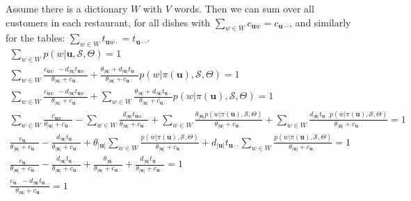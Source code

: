 Assume there is a dictionary $W$ with $V$ words. Then we can sum over all customers in each restaurant, for all dishes with $\sum_{w\in W} c_{\mathbf{u}w} = c_{\mathbf{u}\cdot\cdot}$, and similarly for the tables: $\sum_{w\in W} t_{\mathbf{u}w\cdot} = t_{\mathbf{u}\cdot\cdot}$. 
\begin{equation}
\begin{split}
	\sum_{w\in W} p(w | \mathbf{u}, \mathcal{S}, \Theta) = 1 \\
    \sum_{w\in W}\frac{c_{\mathbf{u}w\cdot} - d_{|\mathbf{u}|}t_{\mathbf{u}w\cdot}}{\theta_{|\mathbf{u}|}+c_{\mathbf{u}\cdot\cdot}} + \frac{\theta_{|\mathbf{u}|} + d_{|\mathbf{u}|}t_{\mathbf{u}\cdot\cdot}}{\theta_{|\mathbf{u}|}+c_{\mathbf{u}\cdot\cdot}} p(w | \pi(\mathbf{u}), \mathcal{S}, \Theta) = 1 \\
    \sum_{w\in W}\frac{c_{\mathbf{u}w\cdot} - d_{|\mathbf{u}|}t_{\mathbf{u}w\cdot}}{\theta_{|\mathbf{u}|}+c_{\mathbf{u}\cdot\cdot}} + \sum_{w\in W} \frac{\theta_{|\mathbf{u}|} + d_{|\mathbf{u}|}t_{\mathbf{u}\cdot\cdot}}{\theta_{|\mathbf{u}|}+c_{\mathbf{u}\cdot\cdot}} p(w | \pi(\mathbf{u}), \mathcal{S}, \Theta) =1 \\
    \sum_{w\in W} \frac{c_{\mathbf{u}w\cdot}}{\theta_{|\mathbf{u}|}+c_{\mathbf{u}\cdot\cdot}} - \sum_{w\in W} \frac{d_{|\mathbf{u}|}t_{\mathbf{u}w\cdot}}{\theta_{|\mathbf{u}|}+c_{\mathbf{u}\cdot\cdot}} + \sum_{w\in W} \frac{\theta_{|\mathbf{u}|}p(w | \pi(\mathbf{u}), \mathcal{S}, \Theta)}{\theta_{|\mathbf{u}|}+c_{\mathbf{u}\cdot\cdot}} + \sum_{w\in W} \frac{d_{|\mathbf{u}|}t_{\mathbf{u}\cdot\cdot} p(w | \pi(\mathbf{u}), \mathcal{S}, \Theta)}{\theta_{|\mathbf{u}|}+c_{\mathbf{u}\cdot\cdot}} = 1 \\
    \frac{c_{\mathbf{u}\cdot\cdot}}{\theta_{|\mathbf{u}|}+c_{\mathbf{u}\cdot\cdot}} - \frac{d_{|\mathbf{u}|}t_{\mathbf{u}\cdot\cdot}}{\theta_{|\mathbf{u}|}+c_{\mathbf{u}\cdot\cdot}} + \theta_{|\mathbf{u}|}\sum_{w\in W} \frac{p(w | \pi(\mathbf{u}), \mathcal{S}, \Theta)}{\theta_{|\mathbf{u}|}+c_{\mathbf{u}\cdot\cdot}} + d_{|\mathbf{u}|}t_{\mathbf{u}\cdot\cdot}\sum_{w\in W} \frac{ p(w | \pi(\mathbf{u}), \mathcal{S}, \Theta)}{\theta_{|\mathbf{u}|}+c_{\mathbf{u}\cdot\cdot}} = 1 \\
    \frac{c_{\mathbf{u}\cdot\cdot}}{\theta_{|\mathbf{u}|}+c_{\mathbf{u}\cdot\cdot}} - \frac{d_{|\mathbf{u}|}t_{\mathbf{u}\cdot\cdot}}{\theta_{|\mathbf{u}|}+c_{\mathbf{u}\cdot\cdot}} +\frac{ \theta_{|\mathbf{u}|}}{\theta_{|\mathbf{u}|}+c_{\mathbf{u}\cdot\cdot}} + \frac{ d_{|\mathbf{u}|}t_{\mathbf{u}\cdot\cdot}}{\theta_{|\mathbf{u}|}+c_{\mathbf{u}\cdot\cdot}} = 1 \\
    \frac{c_{\mathbf{u}\cdot\cdot}- d_{|\mathbf{u}|}t_{\mathbf{u}\cdot\cdot}}{\theta_{|\mathbf{u}|}+c_{\mathbf{u}\cdot\cdot}} = 1
\end{split}
\end{equation}

